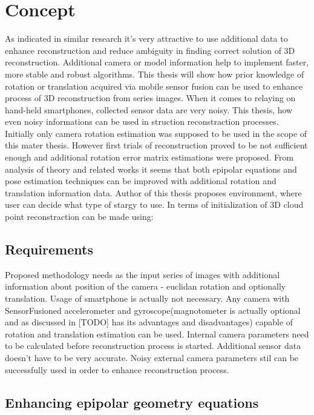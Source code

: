 
\chapter{Concept} %
As indicated in similar research it's very attractive to use additional data to enhance reconstruction and reduce ambiguity in finding correct solution of 3D reconstruction. Additional camera or model information help to implement faster, more stable and robust algorithms. This thesis will show how prior knowledge of rotation or translation acquired via mobile sensor fusion can be used to enhance process of 3D reconstruction from series images. When it comes to relaying on hand-held smartphones, collected sensor data are very noisy. This thesis, how even noisy informations can be used in struction reconstraction processes. Initially only camera rotation estimation was supposed to be used in the scope of this mater thesis. However first trials of reconstruction proved to be not sufficient enough and additional rotation error matrix estimations were proposed.
From analysis of theory and related works it seems that both epipolar equations and pose estimation techniques can be improved with additional rotation and translation information data.  Author of this thesis proposes environment, where user can decide what type of stargy to use. In terms of initialization of 3D cloud point reconstraction can be made using: 

\section{Requirements}
Proposed methodology needs as the input series of images with additional information about position of the camera - euclidan rotation and optionally translation. Usage of smartphone is actually not necessary. Any camera with SensorFusioned accelerometer and gyroscope(magnotometer is actually optional and as discussed in [TODO] has its advantages and disadvantages) capable of rotation and translation estimation can be used. Internal camera parameters need to be calculated before reconstruction process is started. Additional sensor data doesn't have to be very accurate. Noisy external camera parameters stil can be successfully used in order to enhance reconstruction process.
\section{Enhancing epipolar geometry equations}

